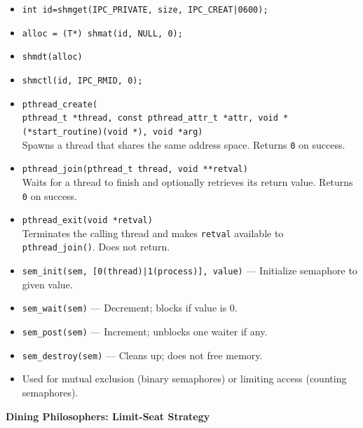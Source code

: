 \documentclass[8pt,twocolumn]{article}
\begin{document}
\begin{itemize}[leftmargin=2em]
    \setlength{\itemsep}{0pt} %
    \setlength{\parskip}{0pt}
    \item \texttt{int id=shmget(IPC\_PRIVATE, size, IPC\_CREAT|0600);}
    \item \texttt{alloc = (T*) shmat(id, NULL, 0);}
    \item \texttt{shmdt(alloc)}
    \item \texttt{shmctl(id, IPC\_RMID, 0);}
    \item \texttt{pthread\_create(\\ pthread\_t *thread, const pthread\_attr\_t *attr, void *(*start\_routine)(void *), void *arg)} \\
    Spawns a thread that shares the same address space. Returns \texttt{0} on success.  
    \item \texttt{pthread\_join(pthread\_t thread, void **retval)} \\
    Waits for a thread to finish and optionally retrieves its return value. Returns \texttt{0} on success.
    \item \texttt{pthread\_exit(void *retval)} \\
    Terminates the calling thread and makes \texttt{retval} available to \texttt{pthread\_join()}. Does not return.
    \item \texttt{sem\_init(sem, [0(thread)|1(process)], value)} — Initialize semaphore to given value.
    \item \texttt{sem\_wait(sem)} — Decrement; blocks if value is 0.
    \item \texttt{sem\_post(sem)} — Increment; unblocks one waiter if any.
    \item \texttt{sem\_destroy(sem)} — Cleans up; does not free memory.
    \item Used for mutual exclusion (binary semaphores) or limiting access (counting semaphores).
\end{itemize}
\vspace{-0.8em}
\textbf{Dining Philosophers: Limit-Seat Strategy}
\vspace{-0.6em}
\end{document}
